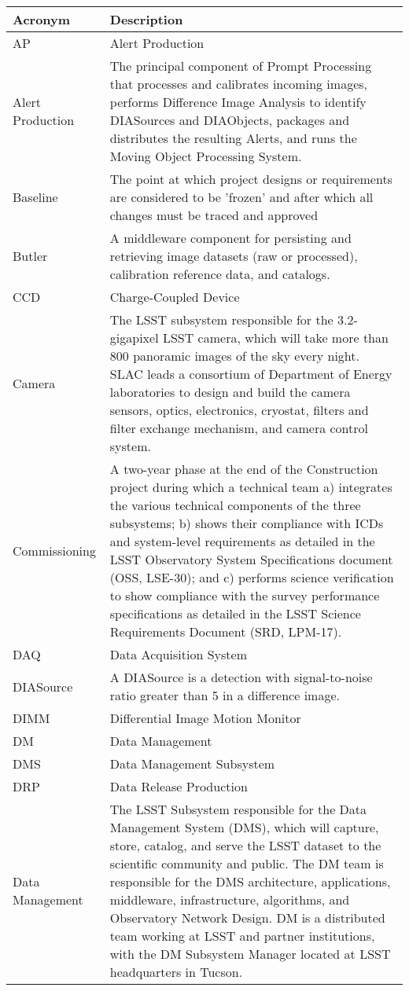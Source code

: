 \addtocounter{table}{-1}
\begin{longtable}{|l|p{}|}\hline
\textbf{Acronym} & \textbf{Description}  \\\hline

AP & Alert Production \\\hline
Alert Production & The principal component of Prompt Processing that processes and calibrates incoming images, performs Difference Image Analysis to identify DIASources and DIAObjects, packages and distributes the resulting Alerts, and runs the Moving Object Processing System. \\\hline
Baseline & The point at which project designs or requirements are considered to be 'frozen' and after which all changes must be traced and approved \\\hline
Butler & A middleware component for persisting and retrieving image datasets (raw or processed), calibration reference data, and catalogs. \\\hline
CCD & Charge-Coupled Device \\\hline
Camera & The LSST subsystem responsible for the 3.2-gigapixel LSST camera, which will take more than 800 panoramic images of the sky every night. SLAC leads a consortium of Department of Energy laboratories to design and build the camera sensors, optics, electronics, cryostat, filters and filter exchange mechanism, and camera control system. \\\hline
Commissioning & A two-year phase at the end of the Construction project during which a technical team a) integrates the various technical components of the three subsystems; b) shows their compliance with ICDs and system-level requirements as detailed in the LSST Observatory System Specifications document (OSS, LSE-30); and c) performs science verification to show compliance with the survey performance specifications as detailed in the LSST Science Requirements Document (SRD, LPM-17). \\\hline
DAQ & Data Acquisition System \\\hline
DIASource & A DIASource is a detection with signal-to-noise ratio greater than 5 in a difference image. \\\hline
DIMM & Differential Image Motion Monitor \\\hline
DM & Data Management \\\hline
DMS & Data Management Subsystem \\\hline
DRP & Data Release Production \\\hline
Data Management & The LSST Subsystem responsible for the Data Management System (DMS), which will capture, store, catalog, and serve the LSST dataset to the scientific community and public. The DM team is responsible for the DMS architecture, applications, middleware, infrastructure, algorithms, and Observatory Network Design. DM is a distributed team working at LSST and partner institutions, with the DM Subsystem Manager located at LSST headquarters in Tucson. \\\hline

\end{longtable}
